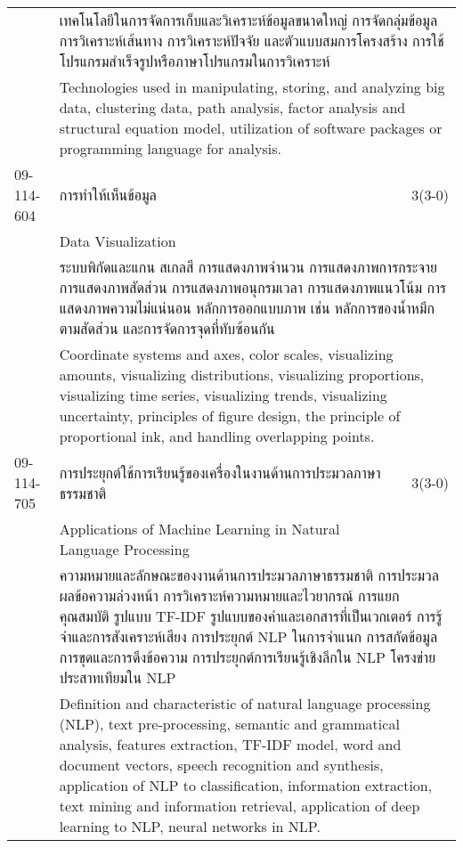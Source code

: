 \begin{longtable}{p{}p{}r{}}
&  \multicolumn{2}{p{0.75\textwidth}}{เทคโนโลยีในการจัดการเก็บและวิเคราะห์ข้อมูลขนาดใหญ่ การจัดกลุ่มข้อมูล การวิเคราะห์เส้นทาง การวิเคราะห์ปัจจัย และตัวแบบสมการโครงสร้าง การใช้โปรแกรมสำเร็จรูปหรือภาษาโปรแกรมในการวิเคราะห์} \vspace{3mm} \\*
&  \multicolumn{2}{p{0.75\textwidth}}{Technologies used in manipulating, storing, and analyzing big data, clustering data, path analysis, factor analysis and structural equation model, utilization of software packages or programming language for analysis.} \vspace{8mm} \\*
09-114-604 & การทำให้เห็นข้อมูล & 3(3-0)\\*
 & Data Visualization & \phantom{x} \vspace{3mm} \\*
&  \multicolumn{2}{p{0.75\textwidth}}{ระบบพิกัดและแกน สเกลสี การแสดงภาพจำนวน การแสดงภาพการกระจาย การแสดงภาพสัดส่วน การแสดงภาพอนุกรมเวลา การแสดงภาพแนวโน้ม การแสดงภาพความไม่แน่นอน หลักการออกแบบภาพ เช่น หลักการของน้ำหมึกตามสัดส่วน และการจัดการจุดที่ทับซ้อนกัน} \vspace{3mm} \\*
&  \multicolumn{2}{p{0.75\textwidth}}{Coordinate systems and axes, color scales, visualizing amounts, visualizing distributions, visualizing proportions, visualizing time series, visualizing trends, visualizing uncertainty, principles of figure design, the principle of proportional ink, and handling overlapping points.} \vspace{8mm} \\*
09-114-705 & การประยุกต์ใช้การเรียนรู้ของเครื่องในงานด้านการประมวลภาษาธรรมชาติ & 3(3-0)\\*
 & Applications of Machine Learning in Natural Language Processing & \phantom{x} \vspace{3mm} \\*
&  \multicolumn{2}{p{0.75\textwidth}}{ความหมายและลักษณะของงานด้านการประมวลภาษาธรรมชาติ การประมวลผลข้อความล่วงหน้า การวิเคราะห์ความหมายและไวยากรณ์ การแยกคุณสมบัติ รูปแบบ TF-IDF รูปแบบของคำและเอกสารที่เป็นเวกเตอร์ การรู้จําและการสังเคราะห์เสียง การประยุกต์ NLP ในการจำแนก การสกัดข้อมูล การขุดและการดึงข้อความ การประยุกต์การเรียนรู้เชิงลึกใน NLP โครงข่ายประสาทเทียมใน NLP} \vspace{3mm} \\*
&  \multicolumn{2}{p{0.75\textwidth}}{Definition and characteristic of natural language processing (NLP), text pre-processing, semantic and grammatical analysis, features extraction, TF-IDF model, word and document vectors, speech recognition and synthesis, application of NLP to classification, information extraction, text mining and information retrieval, application of deep learning to NLP, neural networks in NLP.} \vspace{8mm} \\*

\end{longtable}
